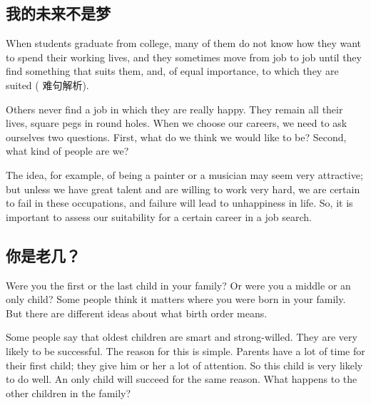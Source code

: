 \subsection{我的未来不是梦}
\begin{margintable}\vspace{-2cm}\footnotesize
\end{margintable}

When students graduate from college, many of them
do not know how they want to spend their working lives,
and they sometimes move from job to job until they find
something that suits them, and, of equal importance,
to which they are suited ( 难句解析).

Others never find a job in which they are really happy.
They remain all their lives, square pegs in round holes.
When we choose our careers, we need to ask ourselves
two questions. First, what do we think we would like to be?
Second, what kind of people are we?

The idea, for example, of being a painter or a musician
may seem very attractive; but unless we have great talent
and are willing to work very hard, we are certain to fail in
these occupations, and failure will lead to unhappiness
in life. So, it is important to assess our suitability for a
certain career in a job search.


\subsection{你是老几？}
\begin{margintable}\vspace{-2cm}\footnotesize
\end{margintable}
Were you the first or the last child in your family? Or were
you a middle or an only child? Some people think it matters
where you were born in your family. But there are different
ideas about what birth order means.

Some people say that oldest children are smart
and strong-willed. They are very likely to be successful.
The reason for this is simple. Parents have a lot of time for
their first child; they give him or her a lot of attention. So
this child is very likely to do well. An only child will
succeed for the same reason. What happens to the other
children in the family?

